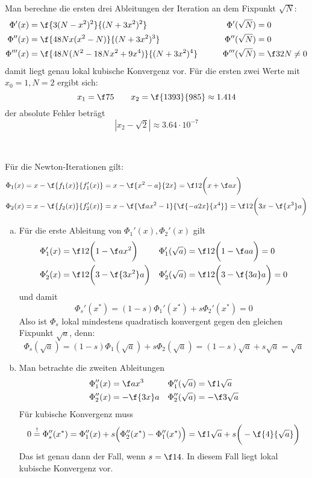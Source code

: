 \documentclass{mywork}
\begin{document}
\begin{aufgabe}
\begin{enumerate}[a)]
			Man berechne die ersten drei Ableitungen der Iteration an dem Fixpunkt $\sqrt{N}$:
			\begin{align*}
				\Phi'(x) &= \f {3(N-x^2)^2}{(N+3x^2)^2} & \Phi'(\sqrt N) &= 0 \\
				\Phi''(x) &= \f {48Nx(x^2-N)}{(N+3x^2)^3} & \Phi''(\sqrt N) &= 0 \\
				\Phi'''(x) &= \f {48N(N^2-18Nx^2+9x^4)}{(N+3x^2)^4} & \qquad \Phi'''(\sqrt N) &= \f 3{2N} \neq 0
			\end{align*}
			damit liegt genau lokal kubische Konvergenz vor.
			Für die ersten zwei Werte mit $x_0 = 1, N = 2$ ergibt sich:
			\[
				x_1 = \f 75 \qquad x_2 = \f {1393}{985} \approx 1.414
			\]
			der absolute Fehler beträgt
			\[
				|x_2 - \sqrt{2}| \approx 3.64 \cdot 10^{-7}
			\]
	\end{enumerate}
\end{aufgabe}

\begin{aufgabe}~

	Für die Newton-Iterationen gilt:
	\begin{align*}
		\Phi_1(x) &= x - \f {f_1(x)}{f_1'(x)} = x - \f {x^2-a}{2x} = \f 12 \bigg( x + \f ax \bigg) \\
		\Phi_2(x) &= x - \f {f_2(x)}{f_2'(x)} = x - \f {\f a{x^2}-1}{\f {-a2x}{x^4}} = \f 12 \bigg( 3x - \f {x^3}a \bigg)
	\end{align*}
	\begin{enumerate}[a)]
		\item
			Für die erste Ableitung von $\Phi_1'(x), \Phi_2'(x)$ gilt
			\begin{align*}
				\Phi_1'(x) &= \f 12 \bigg(1-\f a{x^2} \bigg) & \Phi_1'(\sqrt a) &= \f 12 \bigg(1 - \f aa \bigg) = 0 \\
				\Phi_2'(x) &= \f 12 \bigg(3-\f{3x^2}a \bigg) & \Phi_2'(\sqrt a) &= \f 12 \bigg(3 - \f {3a}a \bigg) = 0
			\end{align*}
			und damit
			\[
				\Phi_s'(x^*) = (1-s)\Phi_1'(x^*) + s \Phi_2'(x^*) = 0
			\]
			Also ist $\Phi_s$ lokal mindestens quadratisch konvergent gegen den gleichen Fixpunkt $\sqrt a$, denn:
			\[
				\Phi_s(\sqrt a) = (1-s)\Phi_1(\sqrt a) + s \Phi_2(\sqrt a) = (1-s)\sqrt a + s\sqrt a = \sqrt a
			\]
		\item
			Man betrachte die zweiten Ableitungen
			\begin{align*}
				\Phi_1''(x) &= \f a{x^3} & \Phi_1''(\sqrt a) &= \f 1{\sqrt a} \\
				\Phi_2''(x) &= - \f {3x}a & \Phi_2''(\sqrt a) &= - \f 3{\sqrt a}
			\end{align*}
			Für kubische Konvergenz muss
			\[
				0 \stackrel != \Phi_s''(x^*) = \Phi_1''(x) + s\Big(\Phi_2''(x^*) - \Phi_1''(x^*) \Big) = \f 1{\sqrt a} + s \bigg( -\f {4}{\sqrt a} \bigg) 
			\]
			Das ist genau dann der Fall, wenn $s = \f 14$.
			In diesem Fall liegt lokal kubische Konvergenz vor.
	\end{enumerate}
\end{aufgabe}
\end{document}
